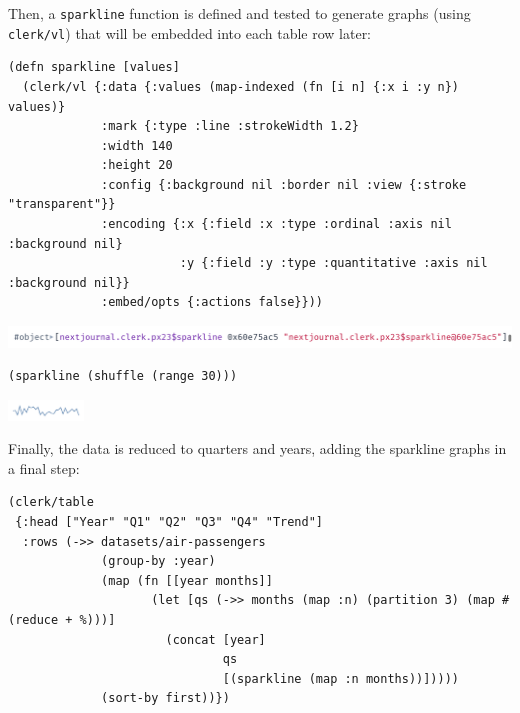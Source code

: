 \documentclass[sigconf,screen]{acmart}
\newcommand{\passthrough}[1]{#1}
\begin{document}
Then, a \passthrough{\lstinline!sparkline!} function is defined and tested to generate graphs (using \passthrough{\lstinline!clerk/vl!}) that will be embedded into each table row later:

\begin{minipage}{\linewidth}
\begin{lstlisting}
(defn sparkline [values]
  (clerk/vl {:data {:values (map-indexed (fn [i n] {:x i :y n}) values)}
             :mark {:type :line :strokeWidth 1.2}
             :width 140
             :height 20
             :config {:background nil :border nil :view {:stroke "transparent"}}
             :encoding {:x {:field :x :type :ordinal :axis nil :background nil}
                        :y {:field :y :type :quantitative :axis nil :background nil}}
             :embed/opts {:actions false}}))
\end{lstlisting}
\end{minipage}

\includegraphics{images/sparkline-result.png}

\begin{minipage}{\linewidth}
\begin{lstlisting}
(sparkline (shuffle (range 30)))
\end{lstlisting}
\end{minipage}

\includegraphics[width=0.15\textwidth]{images/anon-expr-5dr3uWTA777Ny4ajSWGaWCymacQXhQ-result.png}

Finally, the data is reduced to quarters and years, adding the sparkline graphs in a final step:

\begin{minipage}{\linewidth}
\begin{lstlisting}
(clerk/table
 {:head ["Year" "Q1" "Q2" "Q3" "Q4" "Trend"]
  :rows (->> datasets/air-passengers
             (group-by :year)
             (map (fn [[year months]]
                    (let [qs (->> months (map :n) (partition 3) (map #(reduce + %)))]
                      (concat [year] 
                              qs 
                              [(sparkline (map :n months))]))))
             (sort-by first))})
\end{lstlisting}
\end{minipage}
\end{document}
